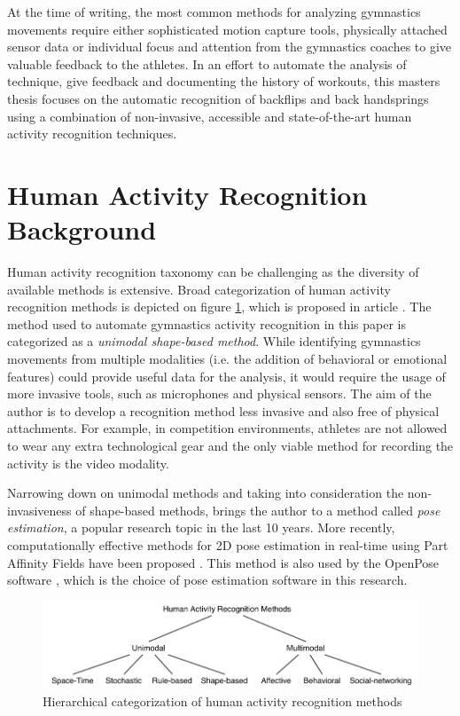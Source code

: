 At the time of writing, the most common methods for analyzing gymnastics movements require either sophisticated motion capture tools, physically attached sensor data or individual focus and attention from the gymnastics coaches to give valuable feedback to the athletes. In an effort to automate the analysis of technique, give feedback and documenting the history of workouts, this masters thesis focuses on the automatic recognition of backflips and back handsprings using a combination of non-invasive, accessible and state-of-the-art human activity recognition techniques.

\section{Human Activity Recognition Background}

Human activity recognition taxonomy can be challenging as the diversity of available methods is extensive. Broad categorization of human activity recognition methods is depicted on figure \ref{har-taxonomy}, which is proposed in article \cite{10.3389/frobt.2015.00028}. The method used to automate gymnastics activity recognition in this paper is categorized as a \textit{unimodal shape-based method}. While identifying gymnastics movements from multiple modalities (i.e. the addition of behavioral or emotional features) could provide useful data for the analysis, it would require the usage of more invasive tools, such as microphones and physical sensors. The aim of the author is to develop a recognition method less invasive and also free of physical attachments. For example, in competition environments, athletes are not allowed to wear any extra technological gear and the only viable method for recording the activity is the video modality. 

Narrowing down on unimodal methods and taking into consideration the non-invasiveness of shape-based methods, brings the author to a method called \textit{pose estimation}, a popular research topic in the last 10 years. More recently, computationally effective methods for 2D pose estimation in real-time using Part Affinity Fields have been proposed \cite{DBLP:journals/corr/CaoSWS16}. This method is also used by the OpenPose software \cite{DBLP:journals/corr/abs-1812-08008}, which is the choice of pose estimation software in this research. 

\begin{figure}[htb]
  \centering
    \includegraphics[width=\textwidth,keepaspectratio]
    {images/introduction/har-taxonomy.pdf}
    \caption{Hierarchical categorization of human activity recognition methods}
    \label{har-taxonomy}
\end{figure}


